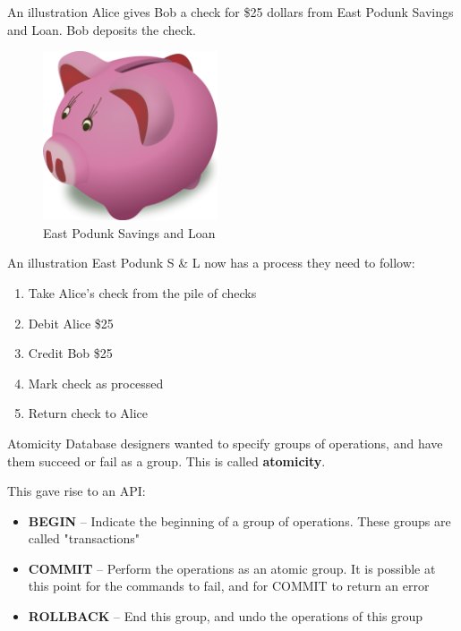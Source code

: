 \documentclass[svgnames]{beamer}
\begin{document}
\begin{frame}{An illustration}
    Alice gives Bob a check for \$25 dollars from East Podunk Savings and
    Loan. Bob deposits the check.
    \begin{figure}
        \includegraphics[height=5cm]{bank}
        \\ East Podunk Savings and Loan
    \end{figure}
\end{frame}

\begin{frame}{An illustration}
    East Podunk S \& L now has a process they need to follow:
    \begin{enumerate}
        \item Take Alice's check from the pile of checks
        \item Debit Alice \$25
        \item Credit Bob \$25
        \item Mark check as processed
        \item Return check to Alice
    \end{enumerate}
\end{frame}

\begin{frame}{Atomicity}
    Database designers wanted to specify groups of operations, and have them
    succeed or fail as a group. This is called \textbf{atomicity}.

    This gave rise to an API:
    \begin{itemize}
        \item \textbf{BEGIN} -- Indicate the beginning of a group of
        operations. These groups are called "transactions"
        \item \textbf{COMMIT} -- Perform the operations as an atomic group. It
        is possible at this point for the commands to fail, and for COMMIT to
        return an error
        \item \textbf{ROLLBACK} -- End this group, and undo the operations of
        this group
    \end{itemize}
\end{frame}
\end{document}
